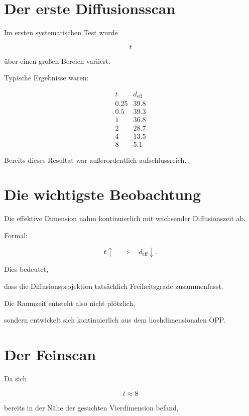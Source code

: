 \section*{Der erste Diffusionsscan}

Im ersten systematischen Test wurde

\[
t
\]

über einen großen Bereich variiert.

Typische Ergebnisse waren:

\[
\begin{array}{c|c}
t
&
d_{\mathrm{eff}}
\\
\hline
0.25
&
39.8
\\
0.5
&
39.3
\\
1
&
36.8
\\
2
&
28.7
\\
4
&
13.5
\\
8
&
5.1
\end{array}
\]

Bereits dieses Resultat war außerordentlich aufschlussreich.


\section*{Die wichtigste Beobachtung}

Die effektive Dimension nahm kontinuierlich mit wachsender Diffusionszeit ab.

Formal:

\[
t
\uparrow
\quad\Longrightarrow\quad
d_{\mathrm{eff}}
\downarrow.
\]

Dies bedeutet,

dass die Diffusionsprojektion tatsächlich Freiheitsgrade zusammenfasst.

Die Raumzeit entsteht also nicht plötzlich,

sondern entwickelt sich kontinuierlich aus dem hochdimensionalen OPP.


\section*{Der Feinscan}

Da sich

\[
t
\approx
8
\]

bereits in der Nähe der gesuchten Vierdimension befand,

